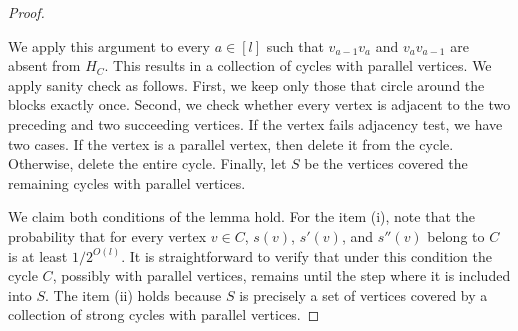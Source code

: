 \begin{proof}
\begin{enumerate}
  \end{enumerate}
  We apply this argument to every $a \in [l]$ such that $v_{a-1} v_a$ and $v_a v_{a-1}$ are absent from $H_C$.
  This results in a collection of cycles with parallel vertices.
  We apply sanity check as follows.
  First, we keep only those that circle around the blocks exactly once.
  Second, we check whether every vertex is adjacent to the two preceding and two succeeding vertices.
  If the vertex fails adjacency test, we have two cases. 
  If the vertex is a parallel vertex, then delete it from the cycle.
  Otherwise, delete the entire cycle.
  Finally, let $S$ be the vertices covered the remaining cycles with parallel vertices.

  We claim both conditions of the lemma hold.
  For the item (i), note that the probability that for every vertex $v \in C$, $s(v)$, $s'(v)$, and $s''(v)$ belong to $C$ is at least $1/2^{O(l)}$.
  It is straightforward to verify that under this condition the cycle $C$, possibly with parallel vertices, remains until the step where it is included into $S$.
  The item (ii) holds because $S$ is precisely a set of vertices covered by a collection of strong cycles with parallel vertices.
\end{proof}

